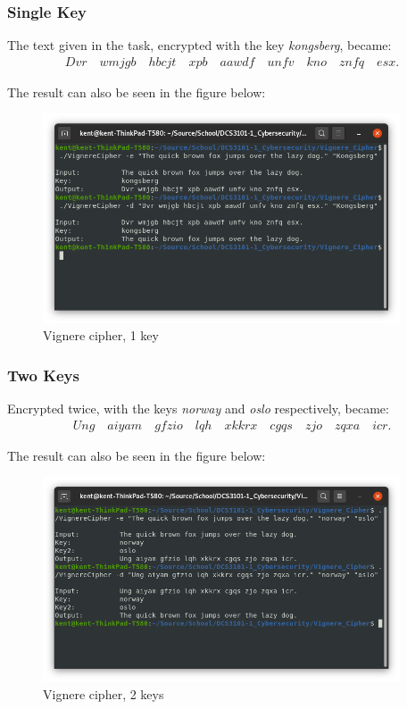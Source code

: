 \documentclass{article}
\begin{document}
\subsubsection{Single Key}

The text given in the task, encrypted with the key \textit{kongsberg}, became:
\begin{align*}
Dvr\quad wmjgb\quad hbcjt\quad xpb\quad aawdf\quad unfv\quad kno\quad znfq\quad esx.
\end{align*}

The result can also be seen in the figure below:

\begin{figure}[H]
 \centering
  \includegraphics[width=300pt]{img/vignere1key.png}
 \caption{Vignere cipher, 1 key}
 \end{figure}

\subsubsection{Two Keys}


Encrypted twice, with the keys \textit{norway} and \textit{oslo} respectively, became:
\begin{align*}
Ung\quad aiyam\quad gfzio\quad lqh\quad xkkrx\quad cgqs\quad zjo\quad zqxa\quad icr.
\end{align*}

The result can also be seen in the figure below:
\begin{figure}[H]
 \centering
  \includegraphics[width=300pt]{img/vignere2keys.png}
 \caption{Vignere cipher, 2 keys}
 \end{figure}
\end{document}

